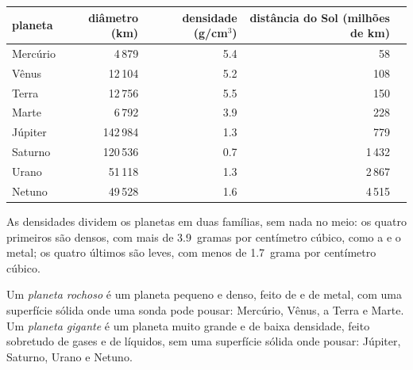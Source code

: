 \begin{center}
\small
\begin{tabular}{lrrrr}
\hline
planeta & diâmetro (km) & densidade (g/cm$^3$) & distância do Sol (milhões de km)\\
\hline
Mercúrio & 4\,879 & 5.4 & 58\\
Vênus & 12\,104 & 5.2 & 108\\
Terra & 12\,756 & 5.5 & 150\\
Marte & 6\,792 & 3.9 & 228\\
\hline
Júpiter & 142\,984 & 1.3 & 779\\
Saturno & 120\,536 & 0.7 & 1\,432\\
Urano & 51\,118 & 1.3 & 2\,867\\
Netuno & 49\,528 & 1.6 & 4\,515\\
\hline
\end{tabular}
\end{center}

As densidades dividem os planetas em duas famílias, sem nada no meio: os
quatro primeiros são densos, com mais de 3.9~gramas por centímetro cúbico,
como a  e o metal; os quatro últimos são leves, com menos de
1.7~grama por centímetro cúbico.

\begin{definition}\label{def:g6:earth-a-planet:planet-types}
Um \emph{planeta rochoso} é um planeta pequeno e
denso, feito de  e de metal, com uma superfície sólida onde uma sonda
pode pousar: Mercúrio, Vênus, a Terra e Marte. Um \emph{planeta
gigante} é um planeta muito grande e de baixa densidade,
feito sobretudo de gases e de líquidos, sem uma superfície sólida onde
pousar: Júpiter, Saturno, Urano e Netuno.
\end{definition}

